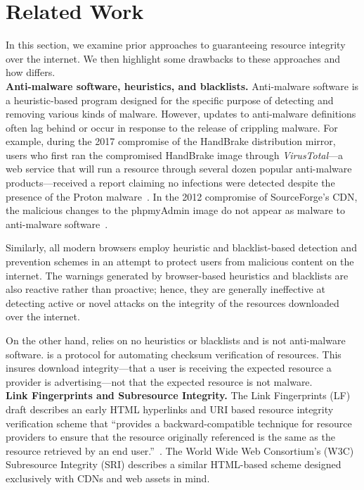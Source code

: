 \section{Related Work} \label{sec:related}

In this section, we examine prior approaches to guaranteeing resource integrity
over the internet. We then highlight some drawbacks to these approaches and how
\SYSTEM{} differs. \\

\noindent\textbf{Anti-malware software, heuristics, and blacklists.}
Anti-malware software is a heuristic-based program designed for the specific
purpose of detecting and removing various kinds of malware. However, updates to
anti-malware definitions often lag behind or occur in response to the release of
crippling malware. For example, during the 2017 compromise of the HandBrake
distribution mirror, users who first ran the compromised HandBrake image through
\textit{VirusTotal}---a web service that will run a resource through several
dozen popular anti-malware products---received a report claiming no infections
were detected despite the presence of the Proton malware~\cite{SCA-HB1}. In the
2012 compromise of SourceForge's CDN, the malicious changes to the phpmyAdmin
image do not appear as malware to anti-malware software~\cite{SCA-PMA1}.

Similarly, all modern browsers employ heuristic and blacklist-based detection
and prevention schemes in an attempt to protect users from malicious content on
the internet. The warnings generated by browser-based heuristics and blacklists
are also reactive rather than proactive; hence, they are generally ineffective
at detecting active or novel attacks on the integrity of the resources
downloaded over the internet.

On the other hand, \SYSTEM{} relies on no heuristics or blacklists and is not
anti-malware software. \SYSTEM{} is a protocol for automating checksum
verification of resources. This insures download integrity---that a user is
receiving the expected resource a provider is advertising---not that the
expected resource is not malware. \\

\noindent\textbf{Link Fingerprints and Subresource Integrity.} The Link
Fingerprints (LF) draft describes an early HTML hyperlinks and URI based
resource integrity verification scheme that ``provides a backward-compatible
technique for resource providers to ensure that the resource originally
referenced is the same as the resource retrieved by an end user.''~\cite{LF}.
The World Wide Web Consortium's (W3C) Subresource Integrity (SRI) describes a
similar HTML-based scheme designed exclusively with CDNs and web assets in mind.


